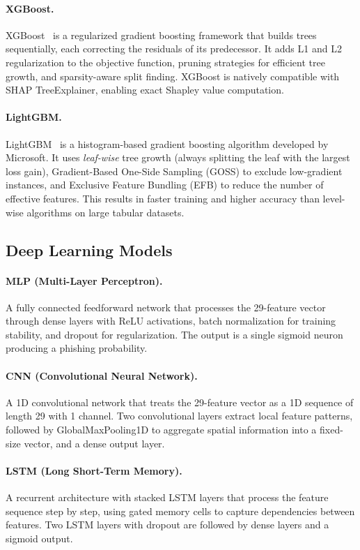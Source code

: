 \paragraph{XGBoost.}
XGBoost~\cite{chen2016} is a regularized gradient boosting framework that builds trees sequentially, each correcting the residuals of its predecessor. It adds L1 and L2 regularization to the objective function, pruning strategies for efficient tree growth, and sparsity-aware split finding. XGBoost is natively compatible with SHAP TreeExplainer, enabling exact Shapley value computation.

\paragraph{LightGBM.}
LightGBM~\cite{ke2017} is a histogram-based gradient boosting algorithm developed by Microsoft. It uses \textit{leaf-wise} tree growth (always splitting the leaf with the largest loss gain), Gradient-Based One-Side Sampling (GOSS) to exclude low-gradient instances, and Exclusive Feature Bundling (EFB) to reduce the number of effective features. This results in faster training and higher accuracy than level-wise algorithms on large tabular datasets.

\subsection{Deep Learning Models}

\paragraph{MLP (Multi-Layer Perceptron).}
A fully connected feedforward network that processes the 29-feature vector through dense layers with ReLU activations, batch normalization for training stability, and dropout for regularization. The output is a single sigmoid neuron producing a phishing probability.

\paragraph{CNN (Convolutional Neural Network).}
A 1D convolutional network that treats the 29-feature vector as a 1D sequence of length 29 with 1 channel. Two convolutional layers extract local feature patterns, followed by GlobalMaxPooling1D to aggregate spatial information into a fixed-size vector, and a dense output layer.

\paragraph{LSTM (Long Short-Term Memory).}
A recurrent architecture with stacked LSTM layers that process the feature sequence step by step, using gated memory cells to capture dependencies between features. Two LSTM layers with dropout are followed by dense layers and a sigmoid output.

